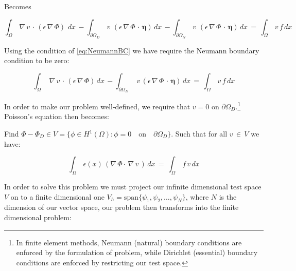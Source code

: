 \documentclass[10pt]{report}
\numberwithin{equation}{section}
\begin{document}
\noindent
Becomes


\vspace{2mm}


\begin{equation}
\int_{\Omega} \, \nabla  \, v  \, \cdot \, \left(\epsilon \, \nabla \, \Phi \right) \, \, dx \, 
-\int_{\partial \Omega_{D}} \, v \, \, \left(\epsilon \, \nabla \, \Phi \, \cdot \, \boldsymbol \eta \right) \, dx \,  
-\int_{\partial \Omega_{N}} \, v \, \, \left(\epsilon \, \nabla \, \Phi \, \cdot \, \boldsymbol \eta \right) \, dx \,  
=  \, \int_{\Omega} \, v \, f \, dx 
\end{equation}


\vspace{2mm}


\noindent
Using the condition of \eqref{eq:NeumannBC} we have require the Neumann boundary condition to be zero:


\vspace{2mm}


$$
\int_{\Omega} \,  \,  \nabla \, v \, \cdot \, \left(\epsilon \, \nabla \, \Phi \right) \,  dx \, 
-\int_{\partial \Omega_{D}} \,  \,  v \,\left(\epsilon \, \nabla \, \Phi \, \cdot \, \boldsymbol \eta \right) \,dx \,  
=  \, \int_{\Omega} \, v \, f \,   dx 
$$

\noindent
In order to make our problem well-defined, we require that $v = 0$ on $\partial \Omega_{D}$.\footnote{In finite element methods, Neumann (natural) boundary conditions are enforced by the formulation of problem, while Dirichlet (essential) boundary conditions are enforced by restricting our test space.}  Poisson's equation then becomes:


\begin{center}
Find $\Phi-\Phi_{D} \in V = \{ \phi \in H^{1}(\Omega): \phi = 0 \quad \text{on} \quad \partial \Omega_{D} \}$. Such that for all $v \, \in \, V$ we have:
\end{center}


\begin{equation}
\int_{\Omega} \, \epsilon(x) \, \left(  \nabla \, \Phi \cdot \,
 \nabla \, v \, \right) \, dx \, 
=  \, \int_{\Omega} \,  f \, v \, dx 
\end{equation}

\vspace{3mm}

\noindent
In order to solve this problem we must project our infinite dimensional test space $V$ on to a finite dimensional one $V_{h} = \text{span}\{\psi_{1}, \psi_{2}, \ldots , \psi_{N}\}$, where $N$ is the dimension of our vector space, our problem then transforms into the finite dimensional problem:
\end{document}
